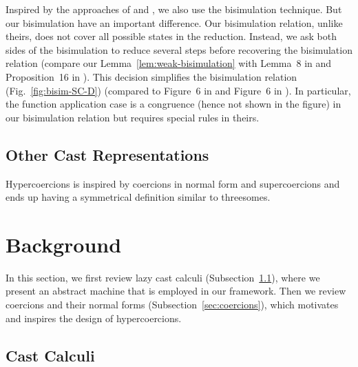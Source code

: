 \documentclass[runningheads]{llncs}
\begin{document}
Inspired by the approaches of \cite{Siek:2010:TWB:1706299.1706342}
and \cite{Siek:2015:BCT:2737924.2737968}, 
we also use the bisimulation technique. But our bisimulation have an
important difference. Our bisimulation relation, unlike theirs, does
not cover all possible states in the reduction. Instead, we ask both 
sides of the bisimulation to reduce several steps before recovering
the bisimulation relation (compare our Lemma~\ref{lem:weak-bisimulation}
with Lemma~8 in \cite{Siek:2010:TWB:1706299.1706342}
and Proposition~16 in \cite{Siek:2015:BCT:2737924.2737968}).
This decision simplifies the bisimulation relation (Fig.~\ref{fig:bisim-SC-D})
(compared to Figure~6 in \cite{Siek:2010:TWB:1706299.1706342} and
Figure~6 in \cite{Siek:2015:BCT:2737924.2737968}).
In particular, the function application case is a congruence
(hence not shown in the figure) in our bisimulation relation
but requires special rules in theirs.


\subsection{Other Cast Representations}
\label{subsec:related-work-other-cast-reprs}

Hypercoercions is inspired by coercions in normal form and supercoercions
and ends up having a symmetrical definition similar to threesomes.

\section{Background} \label{sec:background}

In this section, we first review lazy cast calculi (Subsection~\ref{sec:cast-calculi}), where
we present an abstract machine that is employed in our framework. Then
we review coercions and their normal forms (Subsection~\ref{sec:coercions}), which
motivates and inspires the design of hypercoercions.

\subsection{Cast Calculi} \label{sec:cast-calculi}
\end{document}
